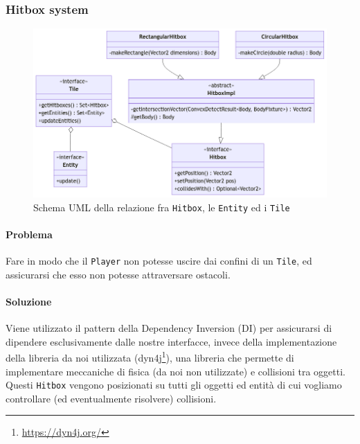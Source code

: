 \documentclass[a4paper,12pt]{report}
\begin{document}
\subsubsection{Hitbox system}
\begin{figure}[H]
\centering{}
\includegraphics[width=1.0\columnwidth]{images/uml-hitbox.png}
\caption{Schema UML della relazione fra \texttt{Hitbox}, le \texttt{Entity} ed i \texttt{Tile}}
\label{img:uml-hitbox}
\end{figure}
\paragraph{Problema} Fare in modo che il \texttt{Player} non potesse uscire dai confini di un \texttt{Tile}, ed assicurarsi che esso non potesse attraversare ostacoli.
\paragraph{Soluzione} Viene utilizzato il pattern della Dependency Inversion (DI) per assicurarsi di dipendere esclusivamente dalle nostre interfacce, invece della implementazione della libreria da noi utilizzata (dyn4j\footnote{\url{https://dyn4j.org/}}), una libreria che permette di implementare meccaniche di fisica (da noi non utilizzate) e collisioni tra oggetti. 
%
Questi \texttt{Hitbox} vengono posizionati su tutti gli oggetti ed entità di cui vogliamo controllare (ed eventualmente risolvere) collisioni.
\end{document}
